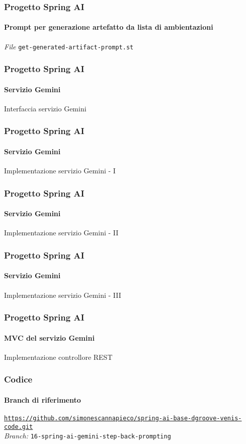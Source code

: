 %
\begin{frame}[t,fragile] \frametitle{Progetto Spring AI}
    \framesubtitle{Prompt per generazione artefatto da lista di ambientazioni}
        \begin{block}{\textit{File} \texttt{get-generated-artifact-prompt.st}}
			{\scriptsize}
    	\end{block}
\end{frame}
%
\begin{frame}[t,fragile] \frametitle{Progetto Spring AI}
    \framesubtitle{Servizio Gemini}
        \vspace*{-.7cm}
        \begin{block}{Interfaccia servizio Gemini}
{\tiny}
    \end{block}
\end{frame}
%
\begin{frame}[t,fragile] \frametitle{Progetto Spring AI}
    \framesubtitle{Servizio Gemini}
		\vspace*{-.7cm}
        \begin{block}{Implementazione servizio Gemini - I}
            {\tiny}
    \end{block}
\end{frame}
%
\begin{frame}[t,fragile] \frametitle{Progetto Spring AI}
    \framesubtitle{Servizio Gemini}
        \vspace*{-.7cm}
        \begin{block}{Implementazione servizio Gemini - II}
            {\tiny}
    \end{block}
\end{frame}
%
\begin{frame}[t,fragile] \frametitle{Progetto Spring AI}
    \framesubtitle{Servizio Gemini}
        \vspace*{-.7cm}
        \begin{block}{Implementazione servizio Gemini - III}
            {\tiny}
    \end{block}
\end{frame}
%
\begin{frame}[t,fragile] \frametitle{Progetto Spring AI}
    \framesubtitle{MVC del servizio Gemini}
    	\vspace*{-.7cm}
        \begin{block}{Implementazione controllore REST}
			{\tiny}
    	\end{block}
\end{frame}
%
\begin{frame}[fragile] \frametitle{Codice}
    \framesubtitle{Branch di riferimento}
	\begin{center}
		{\scriptsize \href{https://github.com/simonescannapieco/spring-ai-base-dgroove-venis-code.git}{\texttt{https://github.com/simonescannapieco/spring-ai-base-dgroove-venis-code.git}}}\\
		\textit{Branch:} \alert{\texttt{16-spring-ai-gemini-step-back-prompting}}
	\end{center}
\end{frame}